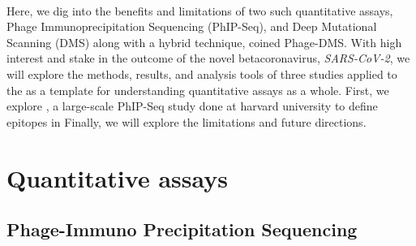 \documentclass{article}
\begin{document}
~ 

Here, we dig into the benefits and limitations of two such quantitative assays, Phage Immunoprecipitation Sequencing (PhIP-Seq), 
and Deep Mutational Scanning (DMS) along with a hybrid technique, coined Phage-DMS. 
With high interest and stake in the outcome of the novel betacoronavirus, \textit{SARS-CoV-2}, we 
will explore the methods, results, and analysis tools of three studies applied to the  as a template for understanding quantitative assays as a whole.
First, we explore \citet{Shrock}, a large-scale PhIP-Seq study done at harvard university to define epitopes in 
Finally, we will explore the limitations and future directions.




\cite{Starr2020}


\section*{Quantitative assays}

\subsection*{Phage-Immuno Precipitation Sequencing}
\end{document}
